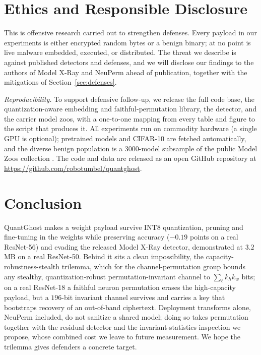 \documentclass[10pt,journal]{IEEEtran}
\theoremstyle{remark}
\newcommand{\sys}{\mbox{QuantGhost}}
\begin{document}
\section{Ethics and Responsible Disclosure}\label{sec:ethics}
This is offensive research carried out to strengthen defenses. Every payload in our
experiments is either encrypted random bytes or a benign binary; at no point is live
malware embedded, executed, or distributed. The threat we describe is against published
detectors and defenses, and we will disclose our findings to the authors of Model X-Ray
and NeuPerm ahead of publication, together with the mitigations of
Section~\ref{sec:defenses}.

\emph{Reproducibility.} To support defensive follow-up, we release the full code base, the
quantization-aware embedding and faithful-permutation library, the detector, and the
carrier model zoos, with a one-to-one mapping from every table and figure to the script
that produces it. All experiments run on commodity hardware (a single GPU is optional);
pretrained models and CIFAR-10 are fetched automatically, and the diverse benign population
is a $3000$-model subsample of the public Model Zoos collection \cite{schurholt2022modelzoos}.
The code and data are released as an open GitHub repository
\cite{quantghost_code} at \url{https://github.com/robotumbel/quantghost}.

\section{Conclusion}\label{sec:concl}
\sys{} makes a weight payload survive INT8 quantization, pruning and fine-tuning in the
weights while preserving accuracy ($-0.19$ points on a real ResNet-56) and evading the
released Model X-Ray detector, demonstrated at $3.2$\,MB on a real ResNet-50. Behind it sits
a clean impossibility, the capacity-robustness-stealth trilemma, which for the
channel-permutation group bounds any stealthy, quantization-robust permutation-invariant
channel to $\sum_\ell k_h k_w$ bits; on a real ResNet-18 a faithful neuron permutation erases
the high-capacity payload, but a $196$-bit invariant channel survives and carries a key that
bootstraps recovery of an out-of-band ciphertext. Deployment transforms alone, NeuPerm
included, do not sanitize a shared model; doing so takes permutation together with the
residual detector and the invariant-statistics inspection we propose, whose combined cost we
leave to future measurement. We hope the trilemma gives defenders a concrete target.
\end{document}

